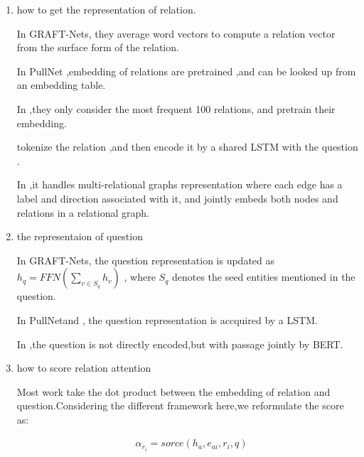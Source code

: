 \documentclass[sigconf]{acmart}
\begin{document}
   	\begin{enumerate}[(1)]
   		
   	\item how to get the representation of relation.
   	
	   	In GRAFT-Nets\cite{sun2018open}, they average word
	   	vectors to compute a relation vector  from the
	   	surface form of the relation.
	   	
	   	In PullNet\cite{sun2019pullnet} ,embedding of  relations are pretrained ,and can be looked up from an embedding table.
	   	
	   	In \cite{min2019knowledge} ,they only consider the most frequent 100 relations, and pretrain their embedding.	
	   	
	   	 \cite{xiong2019improving} tokenize the relation ,and then  encode it by a shared LSTM with the question .
	   
	   	
	   	In \cite{2020Composition},it handles multi-relational graphs  representation where each edge has a label and direction associated with it, and jointly embeds both nodes and relations in a relational graph.
   	
   	\item the representaion of question
   	
   		In GRAFT-Nets\cite{sun2018open},
   		the question representation is updated as
   		$h_q = FFN(\sum_{v\in S_q}h_v)$
   		, where $S_q$ denotes the seed entities mentioned in the question.
   		
   		In PullNet\cite{sun2019pullnet}and \cite{xiong2019improving} ,	the question representation is accquired by a LSTM.
   		
   		In \cite{min2019knowledge} ,the question is not directly encoded,but with passage jointly by BERT.
   		
   		
   	
   	
   	\item how to score relation attention
   	
	   	Most work take the dot product between the embedding of relation and question.Considering the different framework here,we reformulate the score as:
	   	 
	   	 \begin{displaymath}
	   	 	\begin{aligned}
	   	 		&\alpha_{r_i} = sorce( h_{a},e_{ai},r_i,q)    	 		
	   	 	\end{aligned}
	   	 \end{displaymath}
	    
   	
   	
   	
   	
   	
   \end{enumerate} 
   	

	
	
	
	
	
	
\end{document}
